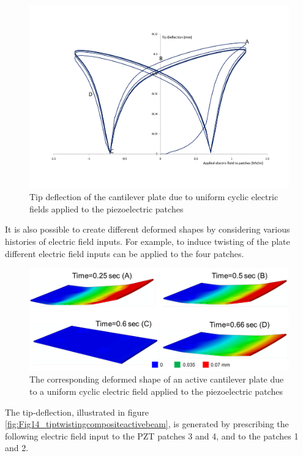 \begin{figure}
\centering
\includegraphics[width=6.0in]{./chap_2_pol_sw/figures/tipdeflectioncompositeactivebeam.pdf}
\caption{Tip deflection of the cantilever plate due to uniform cyclic electric fields applied to the piezoelectric patches}
\label{fig:tipdeflectioncompositeactivebeam}
\end{figure}
It is also possible to create different deformed shapes by considering various histories of electric field inputs. 
For example, to induce twisting of the plate different electric field inputs can be applied to the four patches. 
\begin{figure}
\centering
\includegraphics[width=6.0in]{./chap_2_pol_sw/figures/Figure_13_deformed_shape_active_cantilever.png}
\caption{The corresponding deformed shape of an active cantilever plate due to a uniform cyclic electric field applied to the piezoelectric patches}
\label{fig:Figure_13_deformed_shape_active_cantilever}
\end{figure}
The tip-deflection, illustrated in figure \ref{fig:Fig14_tiptwistingcompositeactivebeam}, is generated by prescribing the following electric field input to the PZT patches 3 and 4, and  to the patches 1 and 2.
